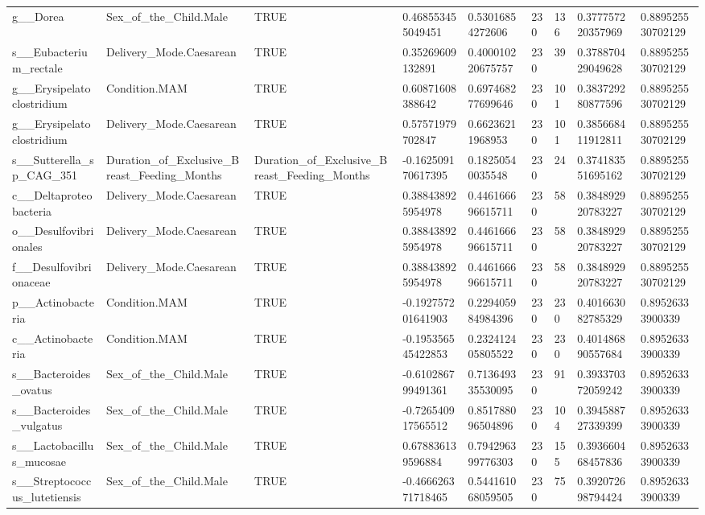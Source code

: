 \begin{longtable}{lllllllll}
g\_\_Dorea & Sex\_of\_the\_Child.Male & TRUE & 0.468553455049451 & 0.53016854272606 & 230 & 136 & 0.377757220357969 & 0.889525530702129 \\
s\_\_Eubacterium\_rectale & Delivery\_Mode.Caesarean & TRUE & 0.35269609132891 & 0.400010220675757 & 230 & 39 & 0.378870429049628 & 0.889525530702129 \\
g\_\_Erysipelatoclostridium & Condition.MAM & TRUE & 0.60871608388642 & 0.697468277699646 & 230 & 101 & 0.383729280877596 & 0.889525530702129 \\
g\_\_Erysipelatoclostridium & Delivery\_Mode.Caesarean & TRUE & 0.57571979702847 & 0.66236211968953 & 230 & 101 & 0.385668411912811 & 0.889525530702129 \\
s\_\_Sutterella\_sp\_CAG\_351 & Duration\_of\_Exclusive\_Breast\_Feeding\_Months & Duration\_of\_Exclusive\_Breast\_Feeding\_Months & -0.162509170617395 & 0.18250540035548 & 230 & 24 & 0.374183551695162 & 0.889525530702129 \\
c\_\_Deltaproteobacteria & Delivery\_Mode.Caesarean & TRUE & 0.388438925954978 & 0.446166696615711 & 230 & 58 & 0.384892920783227 & 0.889525530702129 \\
o\_\_Desulfovibrionales & Delivery\_Mode.Caesarean & TRUE & 0.388438925954978 & 0.446166696615711 & 230 & 58 & 0.384892920783227 & 0.889525530702129 \\
f\_\_Desulfovibrionaceae & Delivery\_Mode.Caesarean & TRUE & 0.388438925954978 & 0.446166696615711 & 230 & 58 & 0.384892920783227 & 0.889525530702129 \\
p\_\_Actinobacteria & Condition.MAM & TRUE & -0.192757201641903 & 0.229405984984396 & 230 & 230 & 0.401663082785329 & 0.89526333900339 \\
c\_\_Actinobacteria & Condition.MAM & TRUE & -0.195356545422853 & 0.232412405805522 & 230 & 230 & 0.401486890557684 & 0.89526333900339 \\
s\_\_Bacteroides\_ovatus & Sex\_of\_the\_Child.Male & TRUE & -0.610286799491361 & 0.713649335530095 & 230 & 91 & 0.393370372059242 & 0.89526333900339 \\
s\_\_Bacteroides\_vulgatus & Sex\_of\_the\_Child.Male & TRUE & -0.726540917565512 & 0.851788096504896 & 230 & 104 & 0.394588727339399 & 0.89526333900339 \\
s\_\_Lactobacillus\_mucosae & Sex\_of\_the\_Child.Male & TRUE & 0.678836139596884 & 0.794296399776303 & 230 & 155 & 0.393660468457836 & 0.89526333900339 \\
s\_\_Streptococcus\_lutetiensis & Sex\_of\_the\_Child.Male & TRUE & -0.466626371718465 & 0.544161068059505 & 230 & 75 & 0.392072698794424 & 0.89526333900339 \\

\end{longtable}
